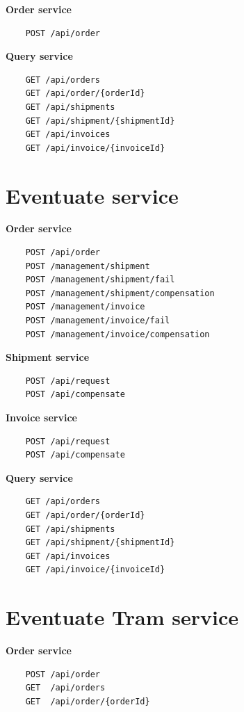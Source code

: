 \documentclass[oneside,
  digital, %
  table,   %
  lof,     %
  lot,     %
]{fithesis3}
\begin{document}
\textbf{Order service}

\begin{verbatim}
    POST /api/order
\end{verbatim}

\noindent
\textbf{Query service}

\begin{verbatim}
    GET /api/orders
    GET /api/order/{orderId}
    GET /api/shipments
    GET /api/shipment/{shipmentId}
    GET /api/invoices
    GET /api/invoice/{invoiceId}
\end{verbatim}

\section{Eventuate service}

\textbf{Order service}

\begin{verbatim}
    POST /api/order
    POST /management/shipment
    POST /management/shipment/fail
    POST /management/shipment/compensation
    POST /management/invoice
    POST /management/invoice/fail
    POST /management/invoice/compensation
\end{verbatim}

\noindent
\textbf{Shipment service}

\begin{verbatim}
    POST /api/request
    POST /api/compensate
\end{verbatim}

\noindent
\textbf{Invoice service}

\begin{verbatim}
    POST /api/request
    POST /api/compensate
\end{verbatim}

\noindent
\textbf{Query service}

\begin{verbatim}
    GET /api/orders
    GET /api/order/{orderId}
    GET /api/shipments
    GET /api/shipment/{shipmentId}
    GET /api/invoices
    GET /api/invoice/{invoiceId}
\end{verbatim}

\section{Eventuate Tram service}

\textbf{Order service}

\begin{verbatim}
    POST /api/order
    GET  /api/orders
    GET  /api/order/{orderId}
\end{verbatim}
\end{document}
